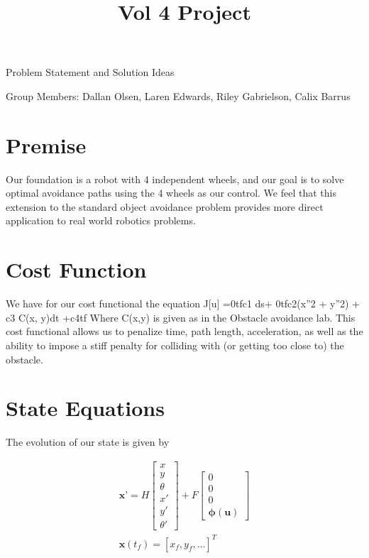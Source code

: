 \documentclass[oneside,12pt]{amsart}
\renewcommand{\vec}[1]{{\ensuremath{\bm{#1}}}}
\newcommand{\0}{{\vec  0 }}
\newcommand{\1}{{\mathbbm{  1} }}
\begin{document}
    
    \title{Vol 4 Project }
    
    \begin{center}
        \textsf{Problem Statement and Solution Ideas}
    \end{center}
    
    Group Members:
    Dallan Olsen, Laren Edwards, Riley Gabrielson, Calix Barrus
    
    \section{Premise}
    Our foundation is a robot with 4 independent wheels, and our goal is to solve optimal avoidance paths using the 4 wheels as our control. We feel that this extension to the standard object avoidance problem provides more direct application to real world robotics problems.
    
    \section{Cost Function}
    We have for our cost functional the equation 
    J[u] =0tfc1 ds+ 0tfc2(x''2 + y''2) + c3 C(x, y)dt +c4tf 
    Where C(x,y) is given as in the Obstacle avoidance lab. This cost functional allows us to penalize time, path length, acceleration, as well as the ability to impose a stiff penalty for colliding with (or getting too close to) the obstacle. 
    
    \section{State Equations}
    The evolution of our state is given by
    
    \begin{align*}
        \vec{x}’ = H \begin{bmatrix} x \\ y \\ \theta \\ x' \\ y' \\ \theta' \end{bmatrix}   + F \begin{bmatrix} 0 \\ 0 \\ 0 \\  \vec{\phi}(\vec{u})  \end{bmatrix} \\
    \vec{x}(t_f) = [x_f, y_f, \ldots]^T
    \end{align*}
    
\end{document}
